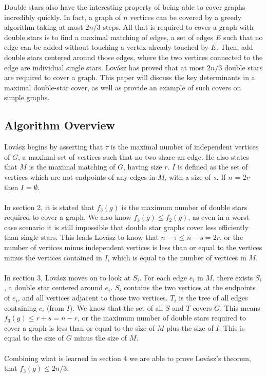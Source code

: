 \documentclass{article}
\begin{document}
	Double stars also have the interesting property of being able to cover graphs incredibly quickly. In fact, a graph of $n$ vertices can be covered by a greedy algorithm taking at most $2n/3$ steps. All that is required to cover a graph with double stars is to find a maximal matching of edges, a set of edges $E$ such that no edge can be added without touching a vertex already touched by $E$. Then, add double stars centered around those edges, where the two vertices connected to the edge are individual single stars. Lov\'asz has proved that at most $2n/3$ double stars are required to cover a graph. This paper will discuss the key determinants in a maximal double-star cover, as well as provide an example of such covers on simple graphs.
	\subsection{Algorithm Overview}
	
	Lov\'asz begins by asserting that $\tau$ is the maximal number of independent vertices of $G$, a maximal set of vertices such that no two share an edge. He also states that $M$ is the maximal matching of $G$, having size $r$. $I$ is defined as the set of vertices which are not endpoints of any edges in $M$, with a size of $s$. If $n$ = $2r$ then $I$ = $\emptyset$.
	\\\\
	In section 2, it is stated that $f_{3}(g)$ is the maximum number of double stars required to cover a graph. We also know $f_{3}(g) \leq f_{2}(g)$, as even in a worst case scenario it is still impossible that double star graphs cover less efficiently than single stars. This leads Lov\'asz to know that $n-\tau \leq n-s = 2r$, or the number of vertices minus independent vertices is less than or equal to the vertices minus the vertices contained in $I$, which is equal to the number of vertices in $M$.
	\\\\
	In section 3, Lov\'asz moves on to look at $S_{i}$. For each edge $e_{i}$ in $M$, there exists $S_{i}$, a double star centered around $e_{i}$. $S_{i}$ contains the two vertices at the endpoints of $e_{i}$, and all vertices adjacent to those two vertices. $T_{i}$ is the tree of all edges containing $c_{i}$ (from $I$). We know that the set of all $S$ and $T$ covers $G$. This means $f_{3}(g) \leq r + s = n - r$, or the maximum number of double stars required to cover a graph is less than or equal to the size of $M$ plus the size of $I$. This is equal to the size of $G$ minus the size of $M$.
	\\\\
	Combining what is learned in section 4 we are able to prove Lov\'asz's theorem, that $f_{3}(g) \leq 2n/3$.
	
\end{document}
